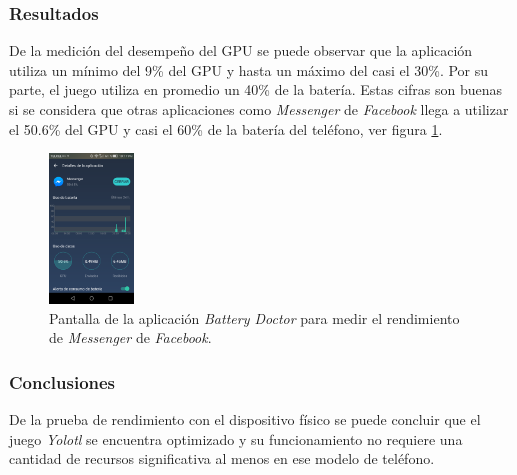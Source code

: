 \subsubsection{Resultados}
De la medición del desempeño del GPU se puede observar que la aplicación
utiliza un mínimo del 9\% del GPU y hasta un máximo del casi el 30\%. Por su
parte, el juego utiliza en promedio un 40\% de la batería. Estas cifras son
buenas si se considera que otras aplicaciones como \textit{Messenger} de
\textit{Facebook} llega a utilizar el 50.6\% del GPU y casi el 60\% de la batería
del teléfono, ver figura \ref{fig:BateriaFacebook}.
\begin{figure}[h]
                        \centering
                        \includegraphics[width=0.2\textwidth]{04ResultadosObetnidos/imagenes/baterry01.png}
                        \caption{Pantalla de la aplicación \textit{Battery Doctor} para medir el
                        rendimiento de \textit{Messenger} de \textit{Facebook}.}
                        \label{fig:BateriaFacebook}
                \end{figure}
\subsubsection{Conclusiones}
De la prueba de rendimiento con el dispositivo físico se puede concluir que el
juego \textit{Yolotl} se encuentra optimizado y su funcionamiento no requiere
una cantidad de recursos significativa al menos en ese modelo de teléfono.

